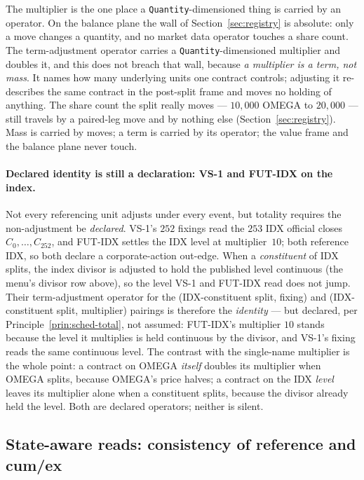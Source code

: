 \documentclass[11pt,a4paper]{article}
\begin{document}
The multiplier is the one place a \texttt{Quantity}-dimensioned thing is carried by an
operator. On the balance plane the wall of Section~\ref{sec:registry} is absolute: only a
move changes a quantity, and no market data operator touches a share count. The term-adjustment
operator carries a \texttt{Quantity}-dimensioned multiplier and doubles it, and this does not
breach that wall, because \emph{a multiplier is a term, not mass}. It names how many
underlying units one contract controls; adjusting it re-describes the same contract in the
post-split frame and moves no holding of anything. The share count the split really moves ---
$10{,}000$ OMEGA to $20{,}000$ --- still travels by a paired-leg move and by nothing else
(Section~\ref{sec:registry}). Mass is carried by moves; a term is carried by its operator; the
value frame and the balance plane never touch.

\paragraph{Declared identity is still a declaration: VS-1 and FUT-IDX on the index.} Not every
referencing unit adjusts under every event, but totality requires the non-adjustment be
\emph{declared}. VS-1's $252$ fixings read the $253$ IDX official closes $C_0,\dots,C_{252}$, and FUT-IDX settles the IDX
level at multiplier~$10$; both reference IDX, so both declare a corporate-action out-edge. When
a \emph{constituent} of IDX splits, the index divisor is adjusted to hold the published level
continuous (the menu's divisor row above), so the level VS-1 and FUT-IDX read does not jump.
Their term-adjustment operator for the (IDX-constituent split, fixing) and (IDX-constituent
split, multiplier) pairings is therefore the \emph{identity} --- but declared, per
Principle~\ref{prin:sched-total}, not assumed: FUT-IDX's multiplier $10$ stands because the
level it multiplies is held continuous by the divisor, and VS-1's fixing reads the same
continuous level. The contrast with the single-name multiplier is the whole point: a contract
on OMEGA \emph{itself} doubles its multiplier when OMEGA splits, because OMEGA's price halves;
a contract on the IDX \emph{level} leaves its multiplier alone when a constituent splits,
because the divisor already held the level. Both are declared operators; neither is silent.

\subsection{State-aware reads: consistency of reference and cum/ex}\label{sec:witness}
\end{document}
